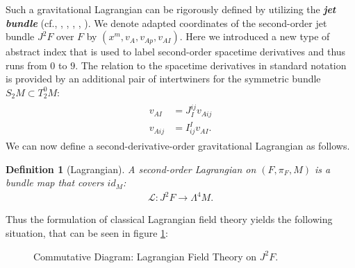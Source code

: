 \documentclass[%
 reprint,
nofootinbib,
 amsmath,amssymb,
 aps,
 prd,
floatfix,
]{revtex4-2}
\newtheorem{definition}{Definition}
\begin{document}
Such a gravitational Lagrangian can be rigorously defined by utilizing the \textit{\textbf{jet bundle}} (cf.\cite{saunders_1989}, \cite{seiler1994analysis}, \cite{seiler2009involution}, \cite{kolar1993natural}, \cite{Gotay1992StressEnergyMomentumTA}, \cite{1998physics...1019G}). 
We denote adapted coordinates of the second-order jet bundle $J^2F$ over $F$ by $(x^m, v_A, v_{Ap}, v_{AI})$. Here we introduced a new type of abstract index that is used to label second-order spacetime derivatives and thus runs from $0$ to $9$. 
The relation to the spacetime derivatives in standard notation is provided by an additional pair of intertwiners for the symmetric bundle $S_2M\subset T^0_2M$:
\begin{align}
    \begin{aligned}
        v_{AI} &= J_I^{ij} v_{Aij}\\
    v_{Aij} &= I^I_{ij} v_{AI}.
    \end{aligned}
\end{align}
We can now define a second-derivative-order gravitational Lagrangian as follows.
\begin{definition}[Lagrangian]
A second-order Lagrangian on $(F,\pi_F,M)$ is a bundle map that covers $id_M$:
\begin{align}
    \mathcal{L} : J^2F \longrightarrow \Lambda^4M.
\end{align}
\end{definition}
Thus the formulation of classical Lagrangian field theory yields the following situation, that can be seen in figure \ref{diagram1}:
\begin{figure}[hbt!]
\centering
{}
\caption{Commutative Diagram: Lagrangian Field Theory on $J^2F$.} \label{diagram1}
\end{figure}
\end{document}
